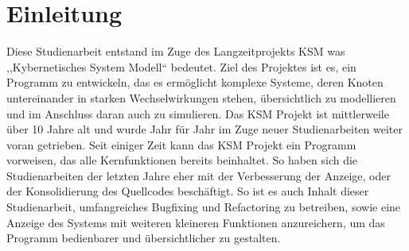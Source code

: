 \section{Einleitung}

Diese Studienarbeit entstand im Zuge des Langzeitprojekts KSM was ,,Kybernetisches System Modell`` bedeutet. Ziel des Projektes ist es, ein Programm zu entwickeln, das es ermöglicht komplexe Systeme, deren Knoten untereinander in starken Wechselwirkungen stehen, übersichtlich zu modellieren und im Anschluss daran auch zu simulieren. Das KSM Projekt ist mittlerweile über 10 Jahre alt und wurde Jahr für Jahr im Zuge neuer Studienarbeiten weiter voran getrieben. Seit einiger Zeit kann das KSM Projekt ein Programm vorweisen, das alle Kernfunktionen bereits beinhaltet. So haben sich die Studienarbeiten der letzten Jahre eher mit der Verbesserung der Anzeige, oder der Konsolidierung des Quellcodes beschäftigt. So ist es auch Inhalt dieser Studienarbeit, umfangreiches Bugfixing und Refactoring zu betreiben, sowie eine Anzeige des Systems mit weiteren kleineren Funktionen anzureichern, um das Programm bedienbarer und übersichtlicher zu gestalten.
